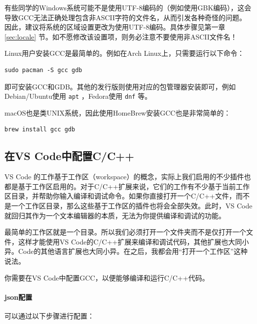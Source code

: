 \begin{caution}
  有些同学的Windows系统可能不是使用UTF-8编码的（例如使用GBK编码），这会导致GCC无法正确处理包含非ASCII字符的文件名，从而引发各种奇怪的问题。因此，建议将系统的区域设置更改为使用UTF-8编码。具体步骤见第一章 \ref{sec:locale} 节。如不愿修改该设置项，则务必注意不要使用非ASCII文件名！
\end{caution}

\begin{tip}
  Linux用户安装GCC是最简单的。例如在Arch Linux上，只需要运行以下命令：
\begin{verbatim}
sudo pacman -S gcc gdb
\end{verbatim}
  即可安装GCC和GDB。其他的发行版则使用对应的包管理器安装即可，例如Debian/Ubuntu使用 \texttt{apt} ，Fedora使用 \texttt{dnf} 等。

  macOS也是类UNIX系统，因此使用HomeBrew安装GCC也是非常简单的：
\begin{verbatim}
brew install gcc gdb
\end{verbatim}
\end{tip}

\subsection{在VS Code中配置C/C++}\label{sec:configure-cpp}

\begin{tip}
  VS Code 的工作基于工作区（workspace）的概念，实际上我们启用的不少插件也都是基于工作区启用的。对于C/C++扩展来说，它们的工作有不少基于当前工作区目录，并帮助你输入编译和调试命令。如果你直接打开一个C/C++文件，而不是一个工作区目录，那么这些基于工作区的插件也将会全部失效。此时，VS Code就回归其作为一个文本编辑器的本质，无法为你提供编译和调试的功能。

  最简单的工作区就是一个目录。所以我们必须打开一个文件夹而不是仅打开一个文件，这样才能使用VS Code的C/C++扩展来编译和调试代码，其他扩展也大同小异。Code的其他语言扩展也大同小异。在之后，我都会用“打开一个工作区”这种说法。
\end{tip}

你需要在VS Code中配置GCC，以便能够编译和运行C/C++代码。

\paragraph{json配置}
可以通过以下步骤进行配置：

